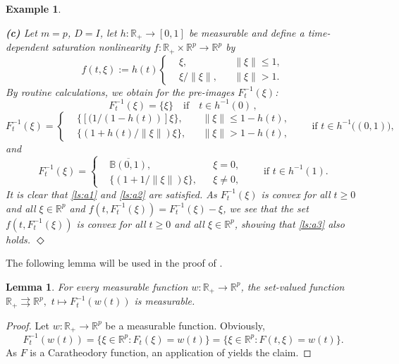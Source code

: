 \documentclass[a4paper,11pt]{article}
\newcommand{\B}{\mathbb B}
\newcommand{\R}{\mathbb R}
\numberwithin{equation}{section}
\numberwithin{figure}{section}
\numberwithin{table}{section}
\newtheorem{lemma}[theorem]{Lemma}
\newtheorem{example}[theorem]{Example}
\begin{document}
\begin{example}
\begin{rm}
{\bf (c)} Let $m=p$, $D=I$, let $h:\R_+\to[0,1]$ be measurable and define a time-dependent
saturation nonlinearity $f:\R_+\times\R^p\to\R^p$ by
\begin{equation}\label{eq:saturation}
f(t,\xi):=h(t)\left\{ \begin{aligned} & \xi, & & \|\xi\|\leq 1,\\
& \xi/\|\xi\|, & & \|\xi\|>1.\end{aligned} \right.
\end{equation}
By routine calculations, we obtain for the pre-images $F_t^{-1}(\xi)$:
%
\[
F_t^{-1}(\xi)=\{\xi\} \quad \text{if} \quad t\in h^{-1}(0)\,,
\]
\[
F_t^{-1}(\xi)=\left\{ \begin{aligned} & \{[(1/(1-h(t))]\xi\}, & & \|\xi\|\leq 1-h(t),\\
& \{(1+h(t)/\|\xi\|)\xi\}, & & \|\xi\|>1-h(t),\end{aligned} \right.
\qquad\mbox{if $t\in h^{-1}\big((0,1)\big)$},
\]
and
\[
F_t^{-1}(\xi)=\left\{ \begin{aligned} & \overline{\B(0,1)}, & & \xi=0,\\
& \{(1+1/\|\xi\|)\xi\}, & & \xi\not=0,\end{aligned} \right.
\qquad\mbox{if $t\in h^{-1}(1)$}.
\]
It is clear that \ref{ls:a1} and \ref{ls:a2} are satisfied. As $F_t^{-1}(\xi)$ is convex for all $t\geq 0$ and all $\xi\in\R^p$ and $f(t,F_t^{-1}(\xi))=F_t^{-1}(\xi)-\xi$, we see that the set $f(t,F_t^{-1}(\xi))$
is convex for all $t\geq 0$ and all $\xi\in\R^p$, showing that \ref{ls:a3} also holds.
\hfill$\Diamond$
\end{rm}
\end{example}
%
The following lemma will be used in the proof of .
%
\begin{lemma}\label{lem:measurability}
For every measurable function $w:\R_+\to\R^p$, the set-valued function
$\R_+\rightrightarrows\R^p,\,\,t\mapsto F_t^{-1}(w(t))$ is measurable.
\end{lemma}
%
\begin{proof}
Let $w:\R_+\to\R^p$ be a measurable function. Obviously,
\[
F_t^{-1}(w(t))=\{\xi\in\R^p:F_t(\xi)=w(t)\}=\{\xi\in\R^p:F(t,\xi)=w(t)\}.
\]
As $F$ is a Caratheodory function, an application of \cite[Theorem 8.2.9]{af09} yields
the claim.
\end{proof}
\end{document}
